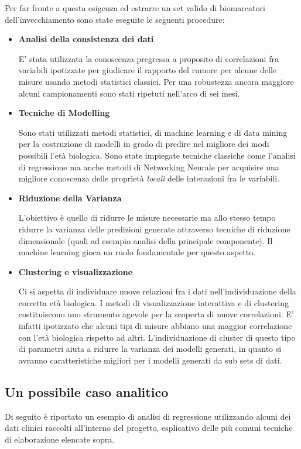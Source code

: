 \documentclass[12pt,openright,twoside,a4paper]{book}
\begin{document}
Per far fronte a questa esigenza ed estrarre un set valido di biomarcatori dell'invecchiamento sono state eseguite le seguenti procedure:
\pagebreak
\begin{itemize}
\item \textbf{Analisi della consistenza dei dati}

E' stata utilizzata la conoscenza pregressa a proposito di correlazioni fra variabili ipotizzate per giudicare il rapporto del rumore per alcune delle misure usando metodi statistici classici.
Per una robustezza ancora maggiore alcuni campionamenti sono stati ripetuti nell'arco di sei mesi.
\item \textbf{Tecniche di Modelling}

Sono stati utilizzati metodi statistici, di machine learning e di data mining per la costruzione di modelli in grado di predire nel migliore dei modi possibili l'età biologica.
Sono state impiegate tecniche classiche come  l'analisi di regressione ma anche metodi di Networking Neurale per acquisire una migliore conoscenza delle proprietà \textit{locali} delle interazioni fra le variabili.

\item \textbf{Riduzione della Varianza}

L'obiettivo è quello di ridurre le misure necessarie ma allo stesso tempo ridurre la varianza delle predizioni generate attraverso tecniche di riduzione dimensionale (quali ad esempio analisi della principale componente).
Il machine learning gioca un ruolo fondamentale per questo aspetto.

\item \textbf{Clustering e visualizzazione}

Ci si aspetta di individuare nuove relazioni fra i dati nell'individuazione della corretta età biologica.
I metodi di visualizzazione interattiva e di clustering costituiscono uno strumento agevole per la scoperta di nuove correlazioni.
E' infatti ipotizzato che alcuni tipi di misure abbiano una maggior correlazione con l'età biologica rispetto ad altri.
L'individuazione di cluster di questo tipo di parametri aiuta a ridurre la varianza dei modelli generati, in quanto si avranno caratteristiche migliori per i modelli generati da sub sets di dati.

\end{itemize}
\pagebreak

\subsection{Un possibile caso analitico}
Di seguito è riportato un esempio di analisi di regressione utilizzando alcuni dei dati clinici raccolti all'interno del progetto, esplicativo delle più comuni tecniche di elaborazione elencate sopra.
\end{document}
